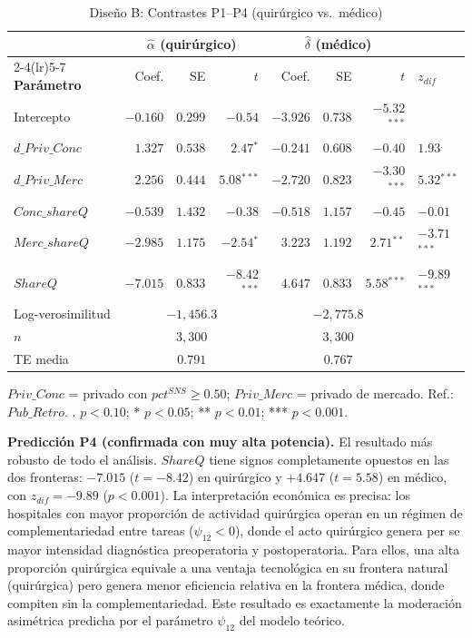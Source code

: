 \documentclass[12pt, a4paper, twoside, openright]{book}
\newcommand{\sig}[1]{\ensuremath{^{#1}}}
\theoremstyle{plain}
\theoremstyle{definition}
\theoremstyle{remark}
\begin{document}
\begin{table}[htbp]
\centering
\caption{Diseño B: Contrastes P1--P4 (quirúrgico vs.\ médico)}
\label{tab:disB}
\begin{threeparttable}
\begin{tabular}{lrrrrrrl}
\toprule
& \multicolumn{3}{c}{\textbf{$\hat{\alpha}$ (quirúrgico)}}
& \multicolumn{3}{c}{\textbf{$\hat{\delta}$ (médico)}} & \\
\cmidrule(lr){2-4}\cmidrule(lr){5-7}
\textbf{Parámetro} & Coef. & SE & $t$
  & Coef. & SE & $t$ & \textbf{$z_{dif}$} \\
\midrule
Intercepto
  & $-0.160$ & $0.299$ & $-0.54$
  & $-3.926$ & $0.738$ & $-5.32$\sig{***} & \\
$d\_Priv\_Conc$
  & $1.327$  & $0.538$ & $2.47$\sig{*}
  & $-0.241$ & $0.608$ & $-0.40$
  & $1.93$\sig{.} \\
$d\_Priv\_Merc$
  & $2.256$  & $0.444$ & $5.08$\sig{***}
  & $-2.720$ & $0.823$ & $-3.30$\sig{***}
  & $5.32$\sig{***} \\
$Conc\_shareQ$
  & $-0.539$ & $1.432$ & $-0.38$
  & $-0.518$ & $1.157$ & $-0.45$
  & $-0.01$ \\
$Merc\_shareQ$
  & $-2.985$ & $1.175$ & $-2.54$\sig{*}
  & $3.223$  & $1.192$ & $2.71$\sig{**}
  & $-3.71$\sig{***} \\
$ShareQ$
  & $-7.015$ & $0.833$ & $-8.42$\sig{***}
  & $4.647$  & $0.833$ & $5.58$\sig{***}
  & $-9.89$\sig{***} \\
\midrule
Log-verosimilitud & \multicolumn{3}{c}{$-1{,}456.3$}
  & \multicolumn{3}{c}{$-2{,}775.8$} & \\
$n$ & \multicolumn{3}{c}{$3{,}300$}
  & \multicolumn{3}{c}{$3{,}300$} & \\
TE media & \multicolumn{3}{c}{$0.791$}
  & \multicolumn{3}{c}{$0.767$} & \\
\bottomrule
\end{tabular}
\begin{tablenotes}
  \small
  \item $Priv\_Conc$ = privado con $pct^{SNS}\geq 0.50$; $Priv\_Merc$ = privado de mercado. Ref.: $Pub\_Retro$. . $p<0.10$; * $p<0.05$; ** $p<0.01$; *** $p<0.001$.
\end{tablenotes}
\end{threeparttable}
\end{table}

\textbf{Predicción P4 (confirmada con muy alta potencia).} El resultado más robusto de todo el análisis. $ShareQ$ tiene signos completamente opuestos en las dos fronteras: $-7.015$ ($t=-8.42$) en quirúrgico y $+4.647$ ($t=5.58$) en médico, con $z_{dif}=-9.89$ ($p<0.001$). La interpretación económica es precisa: los hospitales con mayor proporción de actividad quirúrgica operan en un régimen de complementariedad entre tareas ($\psi_{12}<0$), donde el acto quirúrgico genera per se mayor intensidad diagnóstica preoperatoria y postoperatoria. Para ellos, una alta proporción quirúrgica equivale a una ventaja tecnológica en su frontera natural (quirúrgica) pero genera menor eficiencia relativa en la frontera médica, donde compiten sin la complementariedad. Este resultado es exactamente la moderación asimétrica predicha por el parámetro $\psi_{12}$ del modelo teórico.
\end{document}
